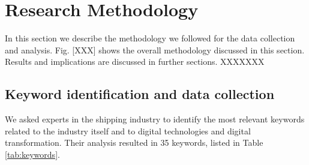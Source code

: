 \documentclass[a4paper, review, endfloat, authoryear]{elsarticle}
\begin{document}
	\section{Research Methodology}
	In this section we describe the methodology we followed for the data collection and analysis. Fig. [XXX] shows the overall methodology discussed in this section. Results and implications are discussed in further sections. XXXXXXX
	
	\subsection{Keyword identification and data collection}
	We asked experts in the shipping industry to identify the most relevant keywords related to the industry itself and to digital technologies and digital transformation. Their analysis resulted in 35 keywords, listed in Table \ref{tab:keywords}.
	
\end{document}
